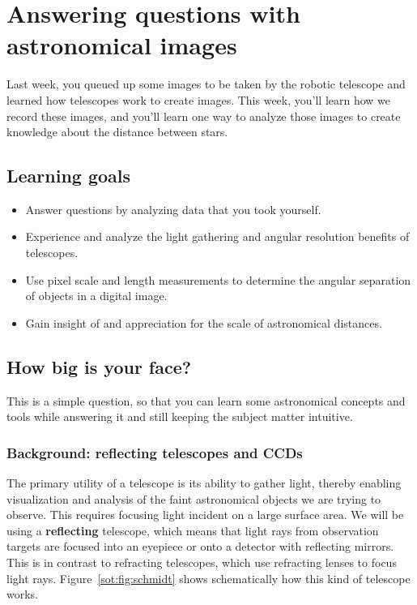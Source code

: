 \chapter{Answering questions with astronomical images}

Last week, you queued up some images to be taken by the robotic telescope and learned how telescopes work to create images. This week, you'll learn how we record these images, and you'll learn one way to analyze those images to create knowledge about the distance between stars.

\section{Learning goals}

\begin{itemize}
	\item Answer questions by analyzing data that you took yourself.
	
	\item Experience and analyze the light gathering and angular resolution benefits of telescopes.
	
	\item Use pixel scale and length measurements to determine the angular separation of objects in a digital image.
	
	\item Gain insight of and appreciation for the scale of astronomical distances.
\end{itemize}



\section{How big is your face?}

This is a simple question, so that you can learn some astronomical concepts and tools while answering it and still keeping the subject matter intuitive.

\subsection{Background: reflecting telescopes and CCDs}

The primary utility of a telescope is its ability to gather light, thereby enabling visualization and analysis of the faint astronomical objects we are trying to observe. This requires focusing light incident on a large surface area. We will be using a \textbf{reflecting} telescope, which means that light rays from observation targets are focused into an eyepiece or onto a detector with reflecting mirrors. This is in contrast to refracting telescopes, which use refracting lenses to focus light rays. Figure~\ref{sot:fig:schmidt} shows schematically how this kind of telescope works. 

